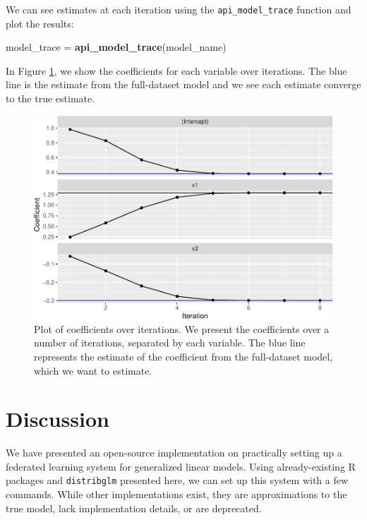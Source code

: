 \documentclass[]{elsarticle} %
\makeatletter
\newenvironment{Shaded}{\begin{snugshade}}{\end{snugshade}}
\newcommand{\KeywordTok}[1]{\textcolor[rgb]{0.13,0.29,0.53}{\textbf{#1}}}
\newcommand{\NormalTok}[1]{#1}
\newcommand{\StringTok}[1]{\textcolor[rgb]{0.31,0.60,0.02}{#1}}
\def\maxwidth{\ifdim\Gin@nat@width>\linewidth\linewidth
\else\Gin@nat@width\fi}
\let\Oldincludegraphics\includegraphics
\renewcommand{\includegraphics}[1]{\Oldincludegraphics[width=\maxwidth]{#1}}
\makeatother
\begin{document}
We can see estimates at each iteration using the \texttt{api\_model\_trace} function and plot the results:

\begin{Shaded}
\begin{Highlighting}[]
\NormalTok{model\_trace =}\StringTok{ }\KeywordTok{api\_model\_trace}\NormalTok{(model\_name)}
\end{Highlighting}
\end{Shaded}

In Figure \ref{fig:traceplot}, we show the coefficients for each variable over iterations. The blue line is the estimate from the full-dataset model and we see each estimate converge to the true estimate.

\begin{figure}
\centering
\includegraphics{index_files/figure-latex/traceplot-1.pdf}
\caption{\label{fig:traceplot}Plot of coefficients over iterations. We present the coefficients over a number of iterations, separated by each variable. The blue line represents the estimate of the coefficient from the full-dataset model, which we want to estimate.}
\end{figure}

\hypertarget{discussion}{%
\section{Discussion}\label{discussion}}

We have presented an open-source implementation on practically setting up a federated learning system for generalized linear models. Using already-existing R packages and \texttt{distribglm} presented here, we can set up this system with a few commands. While other implementations exist, they are approximations to the true model, lack implementation details, or are deprecated.
\end{document}
